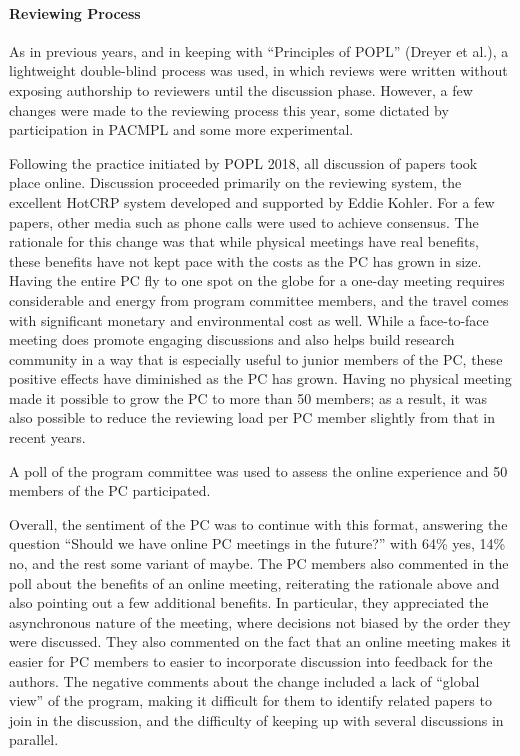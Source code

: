 \paragraph{Reviewing Process}
%
As in previous years, and in keeping with ``Principles of POPL'' (Dreyer et
al.), a lightweight double-blind process was used, in which reviews were
written without exposing authorship to reviewers until the discussion phase.
%
However, a few changes were made to the reviewing process this year,
some dictated by participation in PACMPL and some more experimental.
%

Following the practice initiated by POPL 2018, all discussion of papers took
place online. Discussion proceeded primarily on the reviewing system, the
excellent HotCRP system developed and supported by Eddie Kohler.  For a few
papers, other media such as phone calls were used to achieve consensus. The
rationale for this change was that while physical meetings have real benefits,
these benefits have not kept pace with the costs as the PC has grown in size.
Having the entire PC fly to one spot on the globe for a one-day meeting
requires considerable and energy from program committee members, and the
travel comes with significant monetary and environmental cost as well. While a
face-to-face meeting does promote engaging discussions and also helps build
research community in a way that is especially useful to junior members of the
PC, these positive effects have diminished as the PC has grown. Having no
physical meeting made it possible to grow the PC to more than 50 members; as a
result, it was also possible to reduce the reviewing load per PC member
slightly from that in recent years.

A poll of the program committee was used to assess the online experience and
50 members of the PC participated. 

Overall, the sentiment of the PC was to continue with this format, answering
the question ``Should we have online PC meetings in the future?'' with 64\%
yes, 14\% no, and the rest some variant of maybe.  The PC members also
commented in the poll about the benefits of an online meeting, reiterating the
rationale above and also pointing out a few additional benefits. In
particular, they appreciated the asynchronous nature of the meeting, where
decisions not biased by the order they were discussed. They also commented on
the fact that an online meeting makes it easier for PC members to easier to
incorporate discussion into feedback for the authors.  The negative comments
about the change included a lack of ``global view'' of the program, making it
difficult for them to identify related papers to join in the discussion, and
the difficulty of keeping up with several discussions in parallel. 

